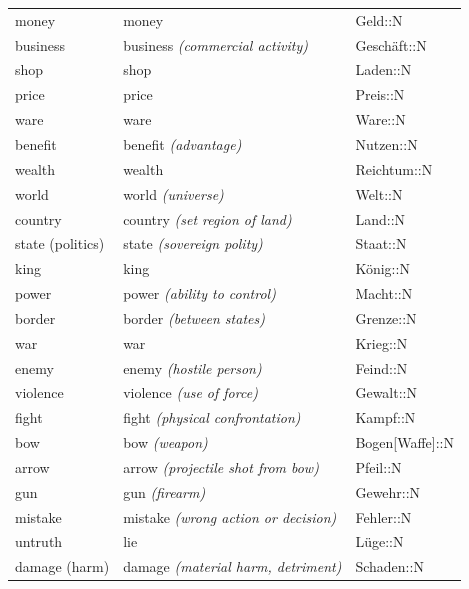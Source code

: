 \begin{center}
\begin{longtable}{lll}
{\sc \lowercase{	MONEY	}}	&	money		&	Geld::N	\\
{\sc \lowercase{	BUSINESS	}}	&	business	\textit{\footnotesize (commercial activity)}	&	Geschäft::N	\\
{\sc \lowercase{	SHOP	}}	&	shop		&	Laden::N	\\
{\sc \lowercase{	PRICE	}}	&	price		&	Preis::N	\\
{\sc \lowercase{	WARE	}}	&	ware		&	Ware::N	\\
{\sc \lowercase{	BENEFIT	}}	&	benefit	\textit{\footnotesize (advantage)}	&	Nutzen::N	\\
{\sc \lowercase{	WEALTH	}}	&	wealth		&	Reichtum::N	\\
{\sc \lowercase{	WORLD	}}	&	world	\textit{\footnotesize (universe)}	&	Welt::N	\\
{\sc \lowercase{	COUNTRY	}}	&	country	\textit{\footnotesize (set region of land)}	&	Land::N	\\
{\sc \lowercase{	STATE \footnotesize (POLITICS)	}}	&	state	\textit{\footnotesize (sovereign polity)}	&	Staat::N	\\
{\sc \lowercase{	KING	}}	&	king		&	König::N	\\
{\sc \lowercase{	POWER	}}	&	power	\textit{\footnotesize (ability to control)}	&	Macht::N	\\
{\sc \lowercase{	BORDER	}}	&	border	\textit{\footnotesize (between states)}	&	Grenze::N	\\
{\sc \lowercase{	WAR	}}	&	war		&	Krieg::N	\\
{\sc \lowercase{	ENEMY	}}	&	enemy	\textit{\footnotesize (hostile person)}	&	Feind::N	\\
{\sc \lowercase{	VIOLENCE	}}	&	violence	\textit{\footnotesize (use of force)}	&	Gewalt::N	\\
{\sc \lowercase{	FIGHT	}}	&	fight	\textit{\footnotesize (physical confrontation)}	&	Kampf::N	\\
{\sc \lowercase{	BOW	}}	&	bow	\textit{\footnotesize (weapon)}	&	Bogen[Waffe]::N	\\
{\sc \lowercase{	ARROW	}}	&	arrow	\textit{\footnotesize (projectile shot from bow)}	&	Pfeil::N	\\
{\sc \lowercase{	GUN	}}	&	gun	\textit{\footnotesize (firearm)}	&	Gewehr::N	\\
{\sc \lowercase{	MISTAKE	}}	&	mistake	\textit{\footnotesize (wrong action or decision)}	&	Fehler::N	\\
{\sc \lowercase{	UNTRUTH	}}	&	lie		&	Lüge::N	\\
{\sc \lowercase{	DAMAGE \footnotesize (HARM)	}}	&	damage	\textit{\footnotesize (material harm, detriment)}	&	Schaden::N	\\

\end{longtable}
\end{center}
